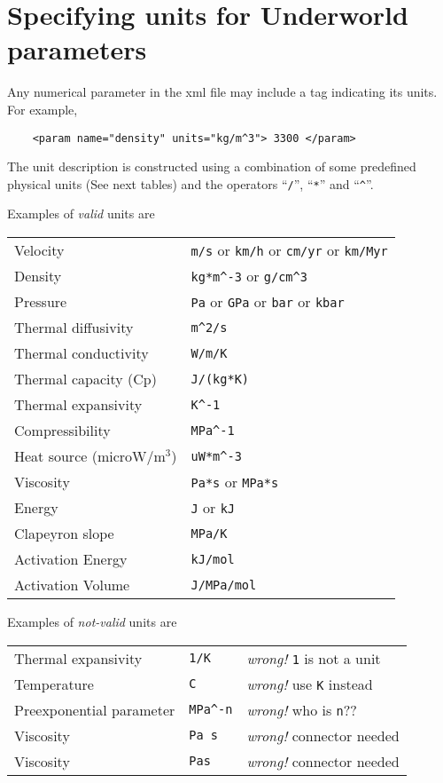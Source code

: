 \documentclass[a4paper,10pt]{article}
\begin{document}
\section{Specifying units for Underworld parameters}

Any numerical parameter in the xml file may include a 
tag indicating its units. For example,
\begin{verbatim}
    <param name="density" units="kg/m^3"> 3300 </param>
\end{verbatim}

The unit description is constructed using a combination of
some predefined physical units (See next tables) and the
operators
``\verb+/+'', ``\verb+*+'' and ``\verb+^+''.

Examples of \emph{valid} units are
\begin{center}
\begin{tabular}{ll}
Velocity & \verb+m/s+ or \verb+km/h+ or \verb+cm/yr+ or
\verb+km/Myr+\\
Density & \verb+kg*m^-3+ or \verb+g/cm^3+ \\
Pressure & \verb+Pa+ or \verb+GPa+ or \verb+bar+ or \verb+kbar+\\
Thermal diffusivity & \verb+m^2/s+ \\
Thermal conductivity & \verb+W/m/K+ \\
Thermal capacity (Cp) & \verb+J/(kg*K)+ \\
Thermal expansivity & \verb+K^-1+ \\
Compressibility & \verb+MPa^-1+ \\
Heat source (microW/m$^3$)& \verb+uW*m^-3+ \\
Viscosity & \verb+Pa*s+ or \verb+MPa*s+\\
Energy & \verb+J+ or \verb+kJ+\\
Clapeyron slope & \verb+MPa/K+ \\
Activation Energy & \verb+kJ/mol+ \\
Activation Volume & \verb+J/MPa/mol+ 
\end{tabular}
\end{center}

Examples of \emph{not-valid} units are

\begin{center}
\begin{tabular}{lll}
Thermal expansivity & \verb+1/K+ & \emph{wrong!}
\texttt{1} is not a unit\\
Temperature & \verb+C+ & \emph{wrong!} use \texttt{K} instead\\
Preexponential parameter & \verb+MPa^-n+ & \emph{wrong!}
who is \texttt{n}?? \\
Viscosity & \verb+Pa s+ & \emph{wrong!} connector needed\\
Viscosity & \verb+Pas+ & \emph{wrong!} connector needed\\
\end{tabular}
\end{center}
\end{document}
